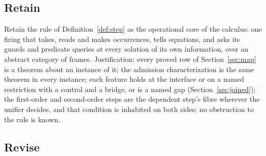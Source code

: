 \documentclass[11pt]{article}
\theoremstyle{remark}
\begin{document}
\subsection{Retain}

Retain the rule of Definition~\ref{def:step} as the operational core of the calculus: one firing
that takes, reads and makes occurrences, tells equations, and asks its guards and predicate queries
at every solution of its own information, over an abstract category of frames. Justification: every
proved row of Section~\ref{sec:map} is a theorem about an instance of it; the admission characterization is the
same theorem in every instance; each feature holds at the interface or on a named restriction with a
control and a bridge, or is a named gap (Section~\ref{sec:joined}); the first-order and second-order steps are the
dependent step's fibre wherever the unifier decides, and that condition is inhabited on both sides;
no obstruction to the rule is known.

\subsection{Revise}
\end{document}
